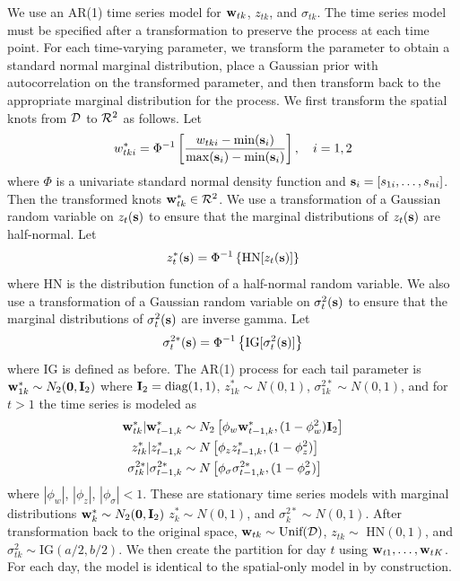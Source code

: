 We use an AR(1) time series model for $\mathbf{w}_{tk}$, $z_{tk}$, and $\sigma_{tk}$.
The time series model must be specified after a transformation to preserve the \skewt process at each time point.
For each time-varying parameter, we transform the parameter to obtain a standard normal marginal distribution, place a Gaussian prior with autocorrelation on the transformed parameter, and then transform back to the appropriate marginal distribution for the \skewt process.
We first transform the spatial knots from ${\cal D}$ to ${\cal R}^2$ as follows.
Let
\begin{align} \label{steq:wstar}
  w^*_{tki} = \Phi^{-1}\left[ \frac{ w_{tki} - \min(\mathbf{s}_i)}{ \max(\mathbf{s}_i) - \min(\mathbf{s}_i) } \right], \quad i = 1, 2
\end{align}
where $\Phi$ is a univariate standard normal density function and $\mathbf{s}_i = [s_{1i}, \ldots, s_{ni}]$.
Then the transformed knots $\mathbf{w}^*_{tk} \in {\cal R}^2$.
We use a transformation of a Gaussian random variable on $z_{t}(\mathbf{s})$ to ensure that the marginal distributions of $z_t(\mathbf{s})$ are half-normal.
Let
\begin{align} \label{steq:zstar}
  z^*_t(\mathbf{s}) = \Phi^{-1}\left\{ \text{HN}[z_t(\mathbf{s})] \right\}
\end{align}
where HN is the distribution function of a half-normal random variable.
We also use a transformation of a Gaussian random variable on $\sigma^2_t(\mathbf{s})$ to ensure that the marginal distributions of $\sigma^2_t(\mathbf{s})$ are inverse gamma.
Let
\begin{align} \label{steq:sigmastar}
  \sigma^{2*}_t(\mathbf{s}) =\Phi^{-1}\left\{ \text{IG}[\sigma^2_t(\mathbf{s})] \right\}
\end{align}
where IG is defined as before.
The AR(1) process for each tail parameter is $\mathbf{w}^*_{1k} \sim N_2(\mathbf{0}, \mathbf{I}_2)$ where $\mathbf{I}_2 = \text{diag}(1, 1)$, $z^*_{1k} \sim N(0, 1)$, $\sigma^{2*}_{1k} \sim N(0, 1)$, and for $t > 1$ the time series is modeled as
\begin{align}
  \mathbf{w}^*_{tk} | \mathbf{w}^*_{t-1, k} &\sim N_2\left[\phi_w \mathbf{w}^*_{t-1, k}, (1 - \phi_w^2) \mathbf{I}_2 \right] \label{steq:ts-wstar}\\
  z^*_{tk} | z^*_{t-1, k} &\sim N \left[\phi_z z^*_{t-1, k}, (1 - \phi_z^2)\right] \label{steq:ts-zstar} \\
  \sigma^{2*}_{tk} | \sigma^{2*}_{t-1, k} &\sim N \left[\phi_\sigma \sigma^{2*}_{t-1, k}, (1 - \phi_\sigma^2) \right] \label{steq:ts-sigmastar}
\end{align}
where $|\phi_w|$, $|\phi_z|$, $|\phi_\sigma| < 1$.
These are stationary time series models with marginal distributions \hbox{$\mathbf{w}^*_{k} \sim N_2(\mathbf{0}, \mathbf{I}_2)$} \hbox{$z^*_{k} \sim N(0, 1)$}, and \hbox{$\sigma^{2*}_{k} \sim N(0, 1)$}.
After transformation back to the original space, $\mathbf{w}_{tk} \sim \text{Unif}({\cal D})$, $z_{tk} \sim $ HN$(0, 1)$, and $\sigma^2_{tk} \sim \text{IG}(a / 2, b / 2)$.
We then create the partition for day $t$ using $\mathbf{w}_{t1}, \ldots, \mathbf{w}_{tK}$.
For each day, the model is identical to the spatial-only model in  by construction.


